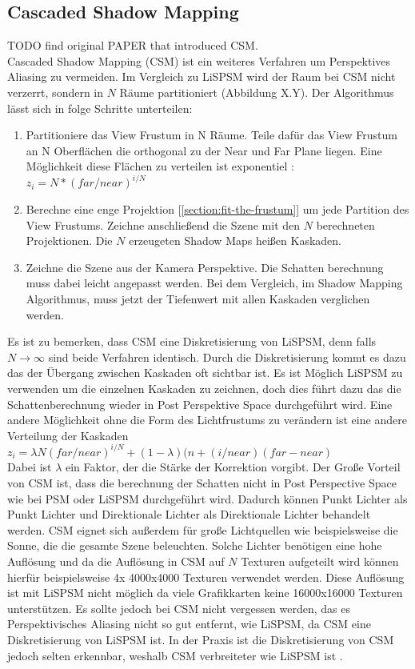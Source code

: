 \subsection{Cascaded Shadow Mapping}
\label{section:csm}
TODO find original PAPER that introduced CSM.\\
Cascaded Shadow Mapping (CSM) ist ein weiteres Verfahren um Perspektives Aliasing zu vermeiden.
Im Vergleich zu LiSPSM wird der Raum bei CSM nicht verzerrt, sondern in $N$ Räume partitioniert (Abbildung X.Y).
\newline
Der Algorithmus lässt sich in folge Schritte unterteilen:
\begin{enumerate}
  \item Partitioniere das View Frustum in N Räume. 
    Teile dafür das View Frustum an N Oberflächen die orthogonal zu der Near und Far Plane liegen.
    Eine Möglichkeit diese Flächen zu verteilen ist exponentiel : $z_{i} = N * (far / near)^{i/N}$
  \item Berechne eine enge Projektion [\ref{section:fit-the-frustum}] um jede Partition des View Frustums.
    Zeichne anschließend die Szene mit den $N$ berechneten Projektionen.
    Die $N$ erzeugeten Shadow Maps heißen Kaskaden.
  \item Zeichne die Szene aus der Kamera Perspektive. 
    Die Schatten berechnung muss dabei leicht angepasst werden.
    Bei dem Vergleich, im Shadow Mapping Algorithmus, muss jetzt der Tiefenwert mit allen Kaskaden verglichen werden.
\end{enumerate}
Es ist zu bemerken, dass CSM eine Diskretisierung von LiSPSM, denn falls $N\rightarrow\infty$ sind beide Verfahren identisch. 
Durch die Diskretisierung kommt es dazu das der Übergang zwischen Kaskaden oft sichtbar ist.
Es ist Möglich LiSPSM zu verwenden um die einzelnen Kaskaden zu zeichnen, doch dies führt dazu das die Schattenberechnung wieder
in Post Perspektive Space durchgeführt wird. 
Eine andere Möglichkeit ohne die Form des Lichtfrustums zu verändern ist eine andere Verteilung der Kaskaden\\
$z_{i} = \lambda{}N(far/near)^{i/N} + (1-\lambda{})(n+(i/near)(far - near)$\\
Dabei ist $\lambda$ ein Faktor, der die Stärke der Korrektion vorgibt.
\newline \newline
Der Große Vorteil von CSM ist, dass die berechnung der Schatten nicht in Post Perspective Space wie bei PSM oder LiSPSM 
durchgeführt wird. 
Dadurch können Punkt Lichter als Punkt Lichter und Direktionale Lichter als Direktionale Lichter behandelt werden.
CSM eignet sich außerdem für große Lichtquellen wie beispielsweise die Sonne, die die gesamte Szene beleuchten.
Solche Lichter benötigen eine hohe Auflösung und da die Auflösung in CSM auf $N$ Texturen aufgeteilt wird können hierfür beispielsweise 
4x 4000x4000 Texturen verwendet werden. Diese Auflösung ist mit LiSPSM nicht möglich da viele Grafikkarten keine
16000x16000 Texturen unterstützen.
Es sollte jedoch bei CSM nicht vergessen werden, das es Perspektivisches Aliasing nicht so gut entfernt, wie 
LiSPSM, da CSM eine Diskretisierung von LiSPSM ist.
In der Praxis ist die Diskretisierung von CSM jedoch selten erkennbar, weshalb CSM verbreiteter wie LiSPSM ist \cite{Survey2011}.

